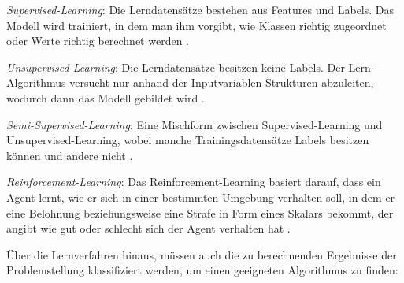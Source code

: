 \begin{itemize*}
\item \emph{Supervised-Learning}: Die Lerndatensätze bestehen aus Features und Labels. Das Modell wird trainiert, in dem man ihm vorgibt, wie Klassen richtig zugeordnet oder Werte richtig berechnet werden \cite[vgl. S. 68]{EM17}. 
\item \emph{Unsupervised-Learning}: Die Lerndatensätze besitzen keine Labels. Der Lern-Algorithmus versucht nur anhand der Inputvariablen Strukturen abzuleiten, wodurch dann das Modell gebildet wird \cite[]{SG17, EM17}. 
\item \emph{Semi-Supervised-Learning}: Eine Mischform zwischen Supervised-Learning und Unsupervised-Learning, wobei manche Trainingsdatensätze Labels besitzen können und andere nicht \cite[vgl. S. 892]{ZH10}. 
\item \emph{Reinforcement-Learning}: Das Reinforcement-Learning basiert darauf, dass ein Agent lernt, wie er sich in einer bestimmten Umgebung verhalten soll, in dem er eine Belohnung beziehungsweise eine Strafe in Form eines Skalars bekommt, der angibt wie gut oder schlecht sich der Agent verhalten hat \cite[vgl. S. 5]{WO12}.  
\end{itemize*}    

Über die Lernverfahren hinaus, müssen auch die zu berechnenden Ergebnisse der Problemstellung klassifiziert werden, um einen geeigneten Algorithmus zu finden:

